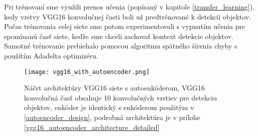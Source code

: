 Pri trénovaní sme využili prenos učenia (popísaný v kapitole \ref{transfer_learning}), kedy vrstvy VGG16 konvolučnej časti boli už predtrénované k detekcii objektov. Počas trénovania celej siete sme potom experimentovali s vypnutím učenia pre spomínanú časť siete, keďže sme chceli zachovať kontext detekcie objektov. Samotné trénovanie prebiehalo pomocou algoritmu spätného šírenia chyby s použítím Adadelta optimizéru. 


\begin{figure}[H]
	\begin{center}
		\texttt{[image: vgg16\_with\_autoencoder.png]}
		\caption[Náčrt architektúry VGG16 siete s autoenkóderom]{
			Náčrt architektúry VGG16 siete s autoenkóderom, VGG16 konvolučná časť obsahuje 10 konvolučných vrstiev pre detekciu objektov, enkóder je identický s enkóderom použitým v \ref{autoencoder_design}, podrobná architektúra je v prílohe \ref{vgg16_autoencoder_architecture_detailed}
		}\label{vgg_16_with_autoencoder}
	\end{center}
\end{figure}

